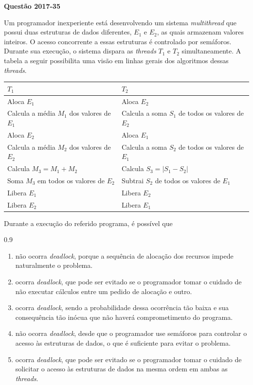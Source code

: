 \documentclass[12pt,a4paper]{article}
\newenvironment{Question}[1]{%
    \pdfbookmark[3]{Questão #1}{q:#1}
    \label{q:#1}
    \par\bigskip\noindent
    \textbf{Questão #1} \dotfill
    \par\noindent
    \nopagebreak
    \ignorespaces
}{%
    \noindent\dotfill
}
\newenvironment{QuestionOptions}{%
    \begin{spacing}{0.9}%
    \small
    \begin{enumerate}[label=\Alph*)]
}{%
    \end{enumerate}
    \end{spacing}
}
\begin{document}
\begin{Question}{2017-35}
Um programador inexperiente está desenvolvendo um sistema \textit{multithread} que possui duas estruturas
de dados diferentes, $E_1$ e $E_2$, as quais armazenam valores inteiros. O acesso concorrente a essas
estruturas é controlado por semáforos. Durante sua execução, o sistema dispara as \textit{threads} $T_1$ e $T_2$
simultaneamente. A tabela a seguir possibilita uma visão em linhas gerais dos algoritmos dessas \textit{threads}.
\begin{center}
\small
\begin{tabular}{|l|l|}\hline
\rowcolor{lightgray}\textbf{$T_1$} & \textbf{$T_2$} \\\hline
Aloca $E_1$ & Aloca $E_2$ \\\hline
Calcula a média $M_1$ dos valores de $E_1$ & Calcula a soma $S_1$ de todos os valores de $E_2$ \\\hline
Aloca $E_2$ & Aloca $E_1$ \\\hline
Calcula a média $M_2$ dos valores de $E_2$ & Calcula a soma $S_2$ de todos os valores de $E_1$ \\\hline
Calcula $M_3 = M_1 + M_2$ & Calcula $S_3 = \lvert S_1 - S_2 \rvert$ \\\hline
Soma $M_3$ em todos os valores de $E_2$ & Subtrai $S_2$ de todos os valores de $E_1$ \\\hline
Libera $E_1$ & Libera $E_2$ \\\hline
Libera $E_2$ & Libera $E_1$ \\\hline
\end{tabular}
\end{center}
Durante a execução do referido programa, é possível que
\begin{QuestionOptions}
    \item não ocorra \textit{deadlock},
    porque a sequência de alocação dos recursos impede naturalmente o problema.
    \item ocorra \textit{deadlock},
    que pode ser evitado se o programador tomar o cuidado de não executar cálculos entre um pedido de alocação e outro.
    \item ocorra \textit{deadlock},
    sendo a probabilidade dessa ocorrência tão baixa e sua consequência tão inócua que não haverá comprometimento do programa.
    \item não ocorra \textit{deadlock},
    desde que o programador use semáforos para controlar o acesso às estruturas de dados,
    o que é suficiente para evitar o problema.
    \item ocorra \textit{deadlock},
    que pode ser evitado se o programador tomar o cuidado de solicitar
    o acesso às estruturas de dados na mesma ordem em ambas as \textit{threads}.
\end{QuestionOptions}
\end{Question}
\end{document}
